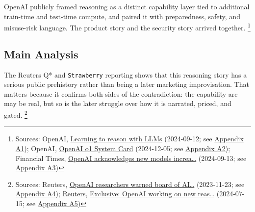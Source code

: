 \documentclass[
  american,
  11pt,
  letterpaper,
]{article}
\begin{document}
OpenAI publicly framed reasoning as a distinct capability layer tied to
additional train-time and test-time compute, and paired it with
preparedness, safety, and misuse-risk language. The product story and
the security story arrived together. \footnote{Sources: OpenAI,
  \href{https://openai.com/index/learning-to-reason-with-llms/}{Learning
  to reason with LLMs} (2024-09-12; see
  \hyperref[ch-06-appendix-a1-learning-to-reason-with-llms]{Appendix
  A1}); OpenAI,
  \href{https://openai.com/index/openai-o1-system-card/}{OpenAI o1
  System Card} (2024-12-05; see
  \hyperref[ch-06-appendix-a2-openai-o1-system-card]{Appendix A2});
  Financial Times,
  \href{https://www.ft.com/content/37ba7236-2a64-4807-b1e1-7e21ee7d0914}{OpenAI
  acknowledges new models increa\ldots{}} (2024-09-13; see
  \hyperref[ch-06-appendix-a3-openai-acknowledges-new-models-increase-risk-of-misuse-to-create-bioweapons]{Appendix
  A3})}

\subsection{Main Analysis}\label{main-analysis-6}

The Reuters Q* and \texttt{Strawberry} reporting shows that this
reasoning story has a serious public prehistory rather than being a
later marketing improvisation. That matters because it confirms both
sides of the contradiction: the capability arc may be real, but so is
the later struggle over how it is narrated, priced, and gated.
\footnote{Sources: Reuters,
  \href{https://www.reuters.com/technology/sam-altmans-ouster-openai-was-precipitated-by-letter-board-about-ai-breakthrough-2023-11-22/}{OpenAI
  researchers warned board of AI\ldots{}} (2023-11-23; see
  \hyperref[ch-06-appendix-a4-openai-researchers-warned-board-of-ai-breakthrough-ahead-of-ceo-ouster-sources-say]{Appendix
  A4}); Reuters,
  \href{https://www.reuters.com/technology/artificial-intelligence/openai-working-new-reasoning-technology-under-code-name-strawberry-2024-07-12/}{Exclusive:
  OpenAI working on new reas\ldots{}} (2024-07-15; see
  \hyperref[ch-06-appendix-a5-exclusive-openai-working-on-new-reasoning-technology-under-code-name-strawberry]{Appendix
  A5})}
\end{document}
